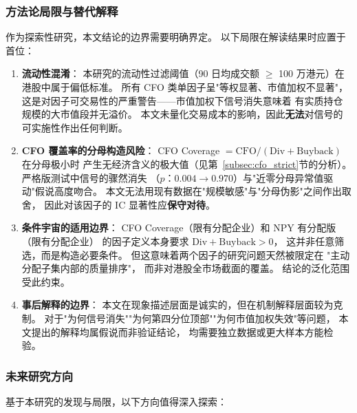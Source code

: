 \documentclass[a4paper,10pt]{article}
\begin{document}
\subsubsection{方法论局限与替代解释}

作为探索性研究，本文结论的边界需要明确界定。
以下局限在解读结果时应置于首位：

\begin{enumerate}[leftmargin=2em]
    \item \textbf{流动性混淆}：
    本研究的流动性过滤阈值（90 日均成交额 $\geq$ 100 万港元）在港股中属于偏低标准。
    所有 CFO 类单因子呈"等权显著、市值加权不显著"，
    这是对因子可交易性的严重警告——市值加权下信号消失意味着
    有实质持仓规模的大市值段并无溢价。
    本文未量化交易成本的影响，因此\textbf{无法}对信号的可实施性作出任何判断。

    \item \textbf{CFO 覆盖率的分母构造风险}：
    CFO Coverage $= \mathrm{CFO} / (\mathrm{Div} + \mathrm{Buyback})$ 在分母极小时
    产生无经济含义的极大值（见第~\ref{subsec:cfo_strict}节的分析）。
    严格版测试中信号的骤然消失
    （$p$：$0.004 \to 0.970$）与"近零分母异常值驱动"假说高度吻合。
    本文无法用现有数据在"规模敏感"与"分母伪影"之间作出取舍，
    因此对该因子的 IC 显著性应\textbf{保守对待}。

    \item \textbf{条件宇宙的适用边界}：
    CFO Coverage（限有分配企业）和 NPY 有分配版（限有分配企业）
    的因子定义本身要求 $\mathrm{Div} + \mathrm{Buyback} > 0$，
    这并非任意筛选，而是构造必要条件。
    但这意味着两个因子的研究问题天然被限定在
    "主动分配子集内部的质量排序"，
    而非对港股全市场截面的覆盖。
    结论的泛化范围受此约束。

    \item \textbf{事后解释的边界}：
    本文在现象描述层面是诚实的，但在机制解释层面较为克制。
    对于"为何信号消失""为何第四分位顶部""为何市值加权失效"等问题，
    本文提出的解释均属假说而非验证结论，
    均需要独立数据或更大样本方能检验。
\end{enumerate}

\subsubsection{未来研究方向}

基于本研究的发现与局限，以下方向值得深入探索：
\end{document}
